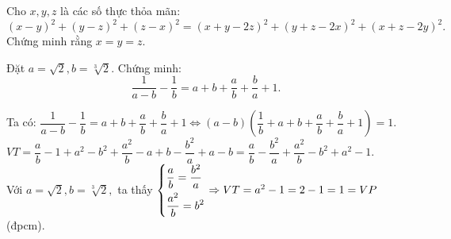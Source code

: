 \begin{vd}%
	Cho $x, y, z$ là các số thực thỏa mãn:\[{\left( {x - y} \right)^2} + {\left( {y - z} \right)^2} + {\left( {z - x} \right)^2} = {\left( {x + y - 2z} \right)^2} + {\left( {y + z - 2x} \right)^2} + {\left( {x + z - 2y} \right)^2}.\]
	Chứng minh rằng $x = y = z.$
\end{vd}
\begin{vd}%
	
	Đặt $ a=\sqrt{2},b=\sqrt[3]{2}. $ Chứng minh: 
	$$\dfrac{1}{a-b}-\dfrac{1}{b}=a+b+\dfrac{a}{b}+\dfrac{b}{a}+1.$$
	
	\loigiai
	{
		Ta có: $\dfrac{1}{a-b}-\dfrac{1}{b}=a+b+\dfrac{a}{b}+\dfrac{b}{a}+1 \Leftrightarrow (a-b)\left(\dfrac{1}{b}+a+b+\dfrac{a}{b}+\dfrac{b}{a}+1\right)=1.$	\\
		$ VT= \dfrac{a}{b}-1+a^2-b^2+\dfrac{a^2}{b}-a+b-\dfrac{b^2}{a}+a-b=\dfrac{a}{b}-\dfrac{b^2}{a}+\dfrac{a^2}{b}-b^2+a^2-1.$\\
		Với $ a=\sqrt{2},b=\sqrt[3]{2}, $  ta thấy 
		$ \left\{\begin{aligned}
			&\dfrac{a}{b}=\dfrac{b^2}{a}\\
			&\dfrac{a^2}{b}=b^2
		\end{aligned}\right. \Rightarrow VT= a^2-1=2-1=1=VP
		$(đpcm).
		
	}
\end{vd}

